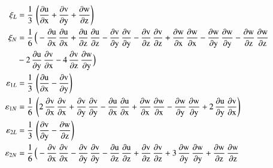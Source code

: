 \begin{subequations}
	\begin{align}
	\mathrm \xi_{L} & = \frac{1}{3} \, \left(\mathrm{\frac{\partial u}{\partial x}} + \mathrm{\frac{\partial v}{\partial y}} + \mathrm{\frac{\partial w}{\partial z}}\right)\\
	\mathrm \xi_{N} & = \frac{1}{6} \, \Big(-\mathrm{\frac{\partial u}{\partial x}}\, \mathrm{\frac{\partial u}{\partial x}} + \mathrm{\frac{\partial u}{\partial z}}\, \mathrm{\frac{\partial u}{\partial z}}  - \mathrm{\frac{ \partial v}{\partial y}}\, \mathrm{\frac{ \partial v}{\partial y}} - \mathrm{\frac{\partial v}{\partial z}}\, \mathrm{\frac{\partial v}{\partial z}} + \mathrm{\frac{\partial w}{\partial x}}\, \mathrm{\frac{\partial w}{\partial x}} - \mathrm{\frac{\partial w}{\partial y}}\, \mathrm{\frac{\partial w}{\partial y}} - \mathrm{\frac{\partial w}{\partial z}}\, \mathrm{\frac{\partial w}{\partial z}} 
	\notag \\
	\mbox{} &  - 2 \, \mathrm{\frac{\partial u}{\partial y}}\, \mathrm{\frac{\partial v}{\partial x}} - 4 \, \mathrm{\frac{\partial v}{\partial z}}\, \mathrm{\frac{\partial w}{\partial y}} \Big)\\
	\mathrm \varepsilon_{1L} & = \frac{1}{3} \, \left(\mathrm{\frac{\partial u}{\partial x}} - \mathrm{\frac{\partial v}{\partial y}}\right)\\
	\mathrm \varepsilon_{1N} & = \frac{1}{6} \, \left(2 \, \mathrm{\frac{\partial v}{\partial x}}\, \mathrm{\frac{\partial v}{\partial x}} + \mathrm{\frac{ \partial v}{\partial y}}\, \mathrm{\frac{ \partial v}{\partial y}} - \mathrm{\frac{\partial u}{\partial x}}\, \mathrm{\frac{\partial u}{\partial x}} +  \mathrm{\frac{\partial w}{\partial x}}\, \mathrm{\frac{\partial w}{\partial x}} -  \mathrm{\frac{\partial w}{\partial y}}\, \mathrm{\frac{\partial w}{\partial y}} + 2 \, \mathrm{\frac{\partial u}{\partial y}}\, \mathrm{\frac{\partial v}{\partial x}}\right)\\
	\mathrm \varepsilon_{2L} & = \frac{1}{3} \, \left(\mathrm{\frac{\partial v}{\partial y}} - \mathrm{\frac{\partial w}{\partial z}}\right)\\
	\mathrm \varepsilon_{2N} & = \frac{1}{6} \, \Big(- \mathrm{\frac{\partial v}{\partial x}}\, \mathrm{\frac{\partial v}{\partial x}} - \mathrm{\frac{ \partial v}{\partial y}}\, \mathrm{\frac{ \partial v}{\partial y}} - \mathrm{\frac{\partial u}{\partial z}}\, \mathrm{\frac{\partial u}{\partial z}} + \mathrm{\frac{\partial v}{\partial z}}\, \mathrm{\frac{\partial v}{\partial z}} + 3 \,  \mathrm{\frac{\partial w}{\partial y}}\, \mathrm{\frac{\partial w}{\partial y}} +  \mathrm{\frac{\partial w}{\partial z}}\, \mathrm{\frac{\partial w}{\partial z}}  \notag \\

\end{align}
\end{subequations}
